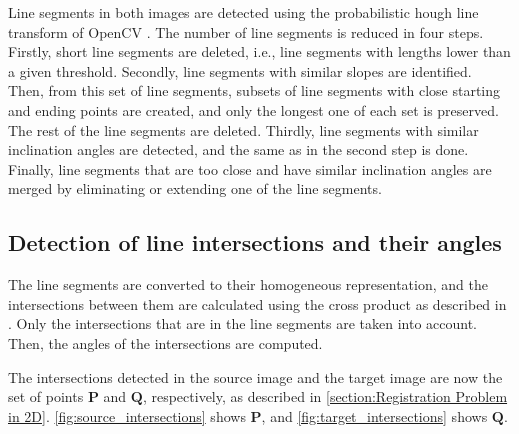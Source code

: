             Line segments in both images are detected using the probabilistic hough line transform of OpenCV \cite{opencv_library}.
            The number of line segments is reduced in four steps. 
            Firstly, short line segments are deleted, i.e., line segments with lengths lower than a given threshold.
            Secondly, line segments with similar slopes are identified. 
            Then, from this set of line segments, subsets of line segments with close starting and ending points are created,
            and only the longest one of each set is preserved. The rest of the line segments are deleted.
            Thirdly, line segments with similar inclination angles are detected, and the same as in the second step is done.
            Finally, line segments that are too close and have similar inclination angles are merged by eliminating or extending one of the line segments.

        \subsection{Detection of line intersections and their angles}
        \label{sub:Detection of line intersections and their angles}
        
            The line segments are converted to their homogeneous representation, 
            and the intersections between them are calculated using the cross product as described in \cite{Hartley_2003_multiple_Book}.
            Only the intersections that are in the line segments are taken into account.
            Then, the angles of the intersections are computed.

            The intersections detected in the source image and the target image are now the set of points $\pmb{P}$ and $\pmb{Q}$, respectively, 
            as described in \autoref{section:Registration Problem in 2D}. 
            \autoref{fig:source_intersections} shows $\pmb{P}$, and \autoref{fig:target_intersections} shows $\pmb{Q}$.

